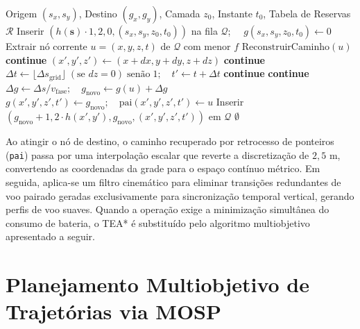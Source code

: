\begin{algorithm}[htbp]
\caption{Expansão de Trajetórias Quadridimensionais no TEA*}\label{alg:tea_expansao}
\begin{algorithmic}[1]
\REQUIRE Origem $(s_x, s_y)$, Destino $(g_x, g_y)$, Camada $z_0$, Instante $t_0$, Tabela de Reservas $\mathcal{R}$
\STATE Inserir $(h(\mathbf{s}) \cdot 1{,}2, 0, (s_x, s_y, z_0, t_0))$ na fila $\mathcal{Q}$; $\quad g(s_x, s_y, z_0, t_0) \leftarrow 0$
    \STATE Extrair nó corrente $u = (x, y, z, t)$ de $\mathcal{Q}$ com menor $f$
     \RETURN $\text{ReconstruirCaminho}(u)$ \ENDIF
     \textbf{continue} \ENDIF
        \STATE $(x', y', z') \leftarrow (x + dx, y + dy, z + dz)$
         \textbf{continue} \ENDIF
        \STATE $\Delta t \leftarrow \lfloor \Delta s_{\text{grid}} \rfloor \; (\text{se } dz = 0) \; \text{senão} \; 1; \quad t' \leftarrow t + \Delta t$
         \textbf{continue} \ENDIF
         \textbf{continue} \ENDIF {}
        \STATE $\Delta g \leftarrow \Delta s / v_{\text{fase}}; \quad g_{\text{novo}} \leftarrow g(u) + \Delta g$
            \STATE $g(x', y', z', t') \leftarrow g_{\text{novo}}; \quad \text{pai}(x', y', z', t') \leftarrow u$
            \STATE Inserir $(g_{\text{novo}} + 1{,}2 \cdot h(x', y'), g_{\text{novo}}, (x', y', z', t'))$ em $\mathcal{Q}$
        \ENDIF
    \ENDFOR
\ENDWHILE
\RETURN $\emptyset$ 
\end{algorithmic}
\end{algorithm}

Ao atingir o nó de destino, o caminho recuperado por retrocesso de ponteiros (\texttt{pai}) passa por uma interpolação escalar que reverte a discretização de $2{,}5\text{ m}$, convertendo as coordenadas da grade para o espaço contínuo métrico. Em seguida, aplica-se um filtro cinemático para eliminar transições redundantes de voo pairado geradas exclusivamente para sincronização temporal vertical, gerando perfis de voo suaves. Quando a operação exige a minimização simultânea do consumo de bateria, o TEA* é substituído pelo algoritmo multiobjetivo apresentado a seguir.

\section{Planejamento Multiobjetivo de Trajetórias via MOSP}\label{sec:dev_mosp}

